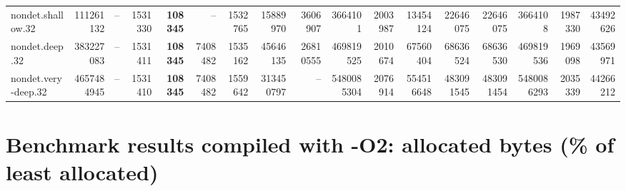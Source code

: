 \documentclass{article}
\begin{document}
\begin{center}
{\begin{tabular}{lrrrrrrrrrrrrrrrr}
nondet.shallow.32 & 111261132 & -- & 1531330 & \textbf{108345} & -- & 1532765 & 15889970 & 3606907 & 3664101 & 2003987 & 13454124 & 22646075 & 22646075 & 3664108 & 1987330 & 43492626 \\
nondet.deep.32 & 383227083 & -- & 1531411 & \textbf{108345} & 7408482 & 1535162 & 45646135 & 26810555 & 469819525 & 2010674 & 67560404 & 68636524 & 68636530 & 469819536 & 1969098 & 43569971 \\
nondet.very-deep.32 & 4657484945 & -- & 1531410 & \textbf{108345} & 7408482 & 1559642 & 313450797 & -- & 5480085304 & 2076914 & 554516648 & 483091545 & 483091454 & 5480086293 & 2035339 & 44266212 \\
\bottomrule
\end{tabular}
}
\end{center}

\section*{Benchmark results compiled with -O2: allocated bytes (\% of least allocated)}
\end{document}
